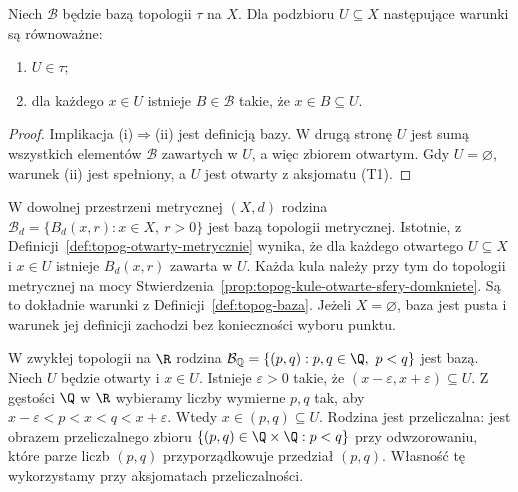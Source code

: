 \begin{stwierdzenie}
\label{prop:topog-otwartosc-przez-baze}
Niech $\mathcal B$ będzie bazą topologii $\tau$ na $X$.
Dla podzbioru $U\subseteq X$ następujące warunki są równoważne:
\begin{enumerate}[label=(\roman*)]
\item $U\in\tau$;
\item dla każdego $x\in U$ istnieje $B\in\mathcal B$
      takie, że $x\in B\subseteq U$.
\end{enumerate}
\end{stwierdzenie}
\begin{proof}
Implikacja (i)$\Rightarrow$(ii) jest definicją bazy.
W drugą stronę $U$ jest sumą wszystkich elementów
$\mathcal B$ zawartych w $U$, a więc zbiorem otwartym.
Gdy $U=\varnothing$, warunek (ii) jest spełniony,
a $U$ jest otwarty z aksjomatu (T1).
\end{proof}

\begin{przyklad}
\label{ex:topog-kule-baza}
W dowolnej przestrzeni metrycznej $(X,d)$ rodzina
$\mathcal B_d=\{B_d(x,r):x\in X,\ r>0\}$
jest bazą topologii metrycznej. Istotnie, z
Definicji~\ref{def:topog-otwarty-metrycznie} wynika,
że dla każdego otwartego $U\subseteq X$ i $x\in U$
istnieje $B_d(x,r)$ zawarta w $U$. Każda kula należy
przy tym do topologii metrycznej na mocy
Stwierdzenia~\ref{prop:topog-kule-otwarte-sfery-domkniete}.
Są to dokładnie warunki z Definicji~\ref{def:topog-baza}.
Jeżeli $X=\varnothing$, baza jest pusta i warunek
jej definicji zachodzi bez konieczności wyboru punktu.
\end{przyklad}

\begin{przyklad}
\label{ex:topog-wymierna-baza}
W zwykłej topologii na $\R$ rodzina
$\mathcal B_{\mathbb Q}=\{(p,q):p,q\in\Q,\ p<q\}$
jest bazą. Niech $U$ będzie otwarty i $x\in U$.
Istnieje $\varepsilon>0$ takie, że
$(x-\varepsilon,x+\varepsilon)\subseteq U$.
Z gęstości $\Q$ w $\R$ wybieramy liczby wymierne
$p,q$ tak, aby $x-\varepsilon<p<x<q<x+\varepsilon$.
Wtedy $x\in(p,q)\subseteq U$. Rodzina jest przeliczalna: jest obrazem przeliczalnego
zbioru $\{(p,q)\in\Q\times\Q:p<q\}$ przy odwzorowaniu,
które parze liczb $(p,q)$ przyporządkowuje przedział $(p,q)$.
Własność tę wykorzystamy przy aksjomatach przeliczalności.
\end{przyklad}

